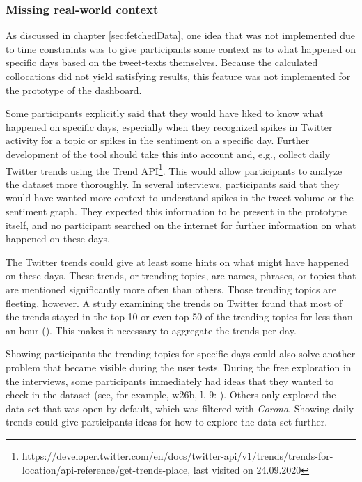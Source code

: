 \subsubsection*{Missing real-world context}
As discussed in chapter \ref{sec:fetchedData}, one idea that was not implemented due to time constraints was to give participants some context as to what happened on specific days based on the tweet-texts themselves. Because the calculated collocations did not yield satisfying results, this feature was not implemented for the prototype of the dashboard.

Some participants explicitly said that they would have liked to know what happened on specific days, especially when they recognized spikes in Twitter activity for a topic or spikes in the sentiment on a specific day. Further development of the tool should take this into account and, e.g., collect daily Twitter trends using the Trend API\footnote{https://developer.twitter.com/en/docs/twitter-api/v1/trends/trends-for-location/api-reference/get-trends-place, last visited on 24.09.2020}. This would allow participants to analyze the dataset more thoroughly. In several interviews, participants said that they would have wanted more context to understand spikes in the tweet volume or the sentiment graph. They expected this information to be present in the prototype itself, and no participant searched on the internet for further information on what happened on these days.

The Twitter trends could give at least some hints on what might have happened on these days. These trends, or trending topics, are names, phrases, or topics that are mentioned significantly more often than others. Those trending topics are fleeting, however. A study examining the trends on Twitter found that most of the trends stayed in the top 10 or even top 50 of the trending topics for less than an hour (\cite{annamoradnejadComprehensiveAnalysisTwitter2019}). This makes it necessary to aggregate the trends per day.

Showing participants the trending topics for specific days could also solve another problem that became visible during the user tests. During the free exploration in the interviews, some participants immediately had ideas that they wanted to check in the dataset (see, for example, w26b, l. 9: ). Others only explored the data set that was open by default, which was filtered with \emph{Corona}. Showing daily trends could give participants ideas for how to explore the data set further.

